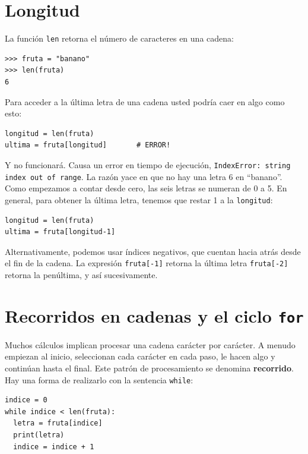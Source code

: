 
\section{Longitud}

 

La función \texttt{len} retorna el número de caracteres en una cadena:

\begin{verbatim}
>>> fruta = "banano"
>>> len(fruta)
6
\end{verbatim}
 Para acceder a la última letra de una cadena usted podría caer en
algo como esto:
\begin{verbatim}
longitud = len(fruta)
ultima = fruta[longitud]       # ERROR!
\end{verbatim}

Y no funcionará. Causa un error en tiempo de ejecución, \texttt{IndexError: string
index out of range}. La razón yace en que no hay una letra 6 en ``banano''.
Como empezamos a contar desde cero, las seis letras se numeran de
0 a 5. En general, para obtener la última letra, tenemos que restar
1 a la \texttt{longitud}:


\begin{verbatim}
longitud = len(fruta)
ultima = fruta[longitud-1]
\end{verbatim}

Alternativamente, podemos usar índices negativos, que cuentan hacia
atrás desde el fin de la cadena. La expresión \texttt{fruta{[}-1{]}}
retorna la última letra \texttt{fruta{[}-2{]}} retorna la penúltima,
y así sucesivamente.


\section{Recorridos en cadenas y el ciclo \texttt{for}}

\label{for} 

   

Muchos cálculos implican procesar una cadena carácter por carácter.
A menudo empiezan al inicio, seleccionan cada carácter en cada paso,
le hacen algo y continúan hasta el final. Este patrón de procesamiento
se denomina \textbf{recorrido}. Hay una forma de realizarlo con la
sentencia \texttt{while}:
\begin{verbatim}
indice = 0
while indice < len(fruta):
  letra = fruta[indice]
  print(letra)
  indice = indice + 1
\end{verbatim}

